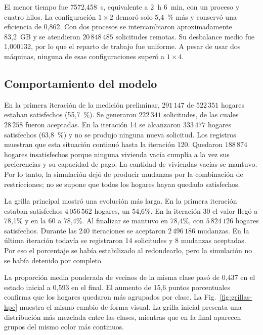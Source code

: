 El menor tiempo fue 7572,458~s, equivalente a 2~h 6~min, con un proceso y
cuatro hilos. La configuración $1\times2$ demoró solo 5,4~\% más y conservó
una eficiencia de 0,862. Con dos procesos se intercambiaron aproximadamente 83,2~GB y se
atendieron $20\,848\,485$ solicitudes remotas. Su desbalance medio fue 1,000132, por
lo que el reparto de trabajo fue uniforme. A pesar de usar dos máquinas,
ninguna de esas configuraciones superó a $1\times4$.

\subsection{Comportamiento del modelo}

En la primera iteración de la medición preliminar, $291\,147$ de $522\,351$ hogares estaban satisfechos (55,7~\%). Se generaron $222\,341$ solicitudes, de las cuales $28\,258$ fueron aceptadas. En la iteración 14 se alcanzaron $333\,477$ hogares satisfechos (63,8~\%) y no se produjo ninguna nueva solicitud. Los registros muestran que esta situación continuó hasta la iteración 120. Quedaron $188\,874$ hogares insatisfechos porque ninguna vivienda vacía cumplía a la vez sus preferencias y su capacidad de pago. La cantidad de viviendas vacías se mantuvo. Por lo tanto, la simulación dejó de producir mudanzas por la combinación de restricciones; no se supone que todos los hogares hayan quedado satisfechos.

La grilla principal mostró una evolución más larga. En la primera iteración estaban satisfechos $4\,056\,562$ hogares, un 54,6\%. En la iteración 30 el valor llegó a 78,1\% y en la 60 a 78,4\%. Al finalizar se mantuvo en 78,4\%, con $5\,824\,126$ hogares satisfechos. Durante las 240 iteraciones se aceptaron $2\,496\,186$ mudanzas. En la última iteración todavía se registraron 14 solicitudes y 8 mudanzas aceptadas. Por eso el porcentaje se había estabilizado al redondearlo, pero la simulación no se había detenido por completo.

La proporción media ponderada de vecinos de la misma clase pasó de 0,437 en el estado inicial a 0,593 en el final. El aumento de 15,6 puntos porcentuales confirma que los hogares quedaron más agrupados por clase. La Fig.~\ref{fig:grillas-hpc} muestra el mismo cambio de forma visual. La grilla inicial presenta una distribución más mezclada entre las clases, mientras que en la final aparecen grupos del mismo color más continuos.

